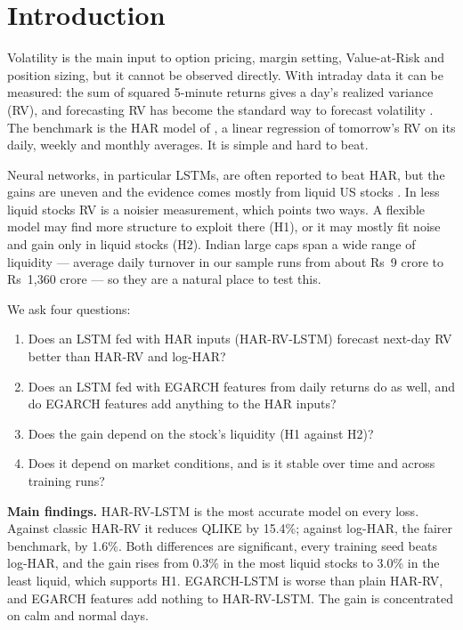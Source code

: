 \documentclass[11pt,a4paper]{article}
\let\oldsection\section
\renewcommand{\section}{\FloatBarrier\needspace{6\baselineskip}\oldsection}
\begin{document}
\tableofcontents
\clearpage

\section{Introduction}

Volatility is the main input to option pricing, margin setting, Value-at-Risk and position sizing,
but it cannot be observed directly. With intraday data it can be measured: the sum of squared 5-minute
returns gives a day's realized variance (RV), and forecasting RV has become the standard way to forecast
volatility \citep{andersen2003}. The benchmark is the HAR model of \citet{corsi2009}, a linear
regression of tomorrow's RV on its daily, weekly and monthly averages. It is simple and hard to beat.

Neural networks, in particular LSTMs, are often reported to beat HAR, but the gains are uneven and
the evidence comes mostly from liquid US stocks \citep{bucci2020,rahimikia2020,christensen2023}.
In less liquid stocks RV is a noisier measurement, which points two ways. A flexible model may find more
structure to exploit there (H1), or it may mostly fit noise and gain only in liquid stocks (H2).
Indian large caps span a wide range of liquidity --- average daily turnover in our sample runs from
about Rs~9 crore to Rs~1,360 crore --- so they are a natural place to test this.

We ask four questions:
\begin{enumerate}
\item Does an LSTM fed with HAR inputs (HAR-RV-LSTM) forecast next-day RV better than HAR-RV and log-HAR?
\item Does an LSTM fed with EGARCH features from daily returns do as well, and do EGARCH features add
anything to the HAR inputs?
\item Does the gain depend on the stock's liquidity (H1 against H2)?
\item Does it depend on market conditions, and is it stable over time and across training runs?
\end{enumerate}

\textbf{Main findings.} HAR-RV-LSTM is the most accurate model on every loss. Against classic HAR-RV it
reduces QLIKE by 15.4\%; against log-HAR, the fairer benchmark, by 1.6\%. Both differences are
significant, every training seed beats log-HAR, and the gain rises from 0.3\% in the most liquid stocks to
3.0\% in the least liquid, which supports H1. EGARCH-LSTM is worse than plain HAR-RV, and EGARCH features
add nothing to HAR-RV-LSTM. The gain is concentrated on calm and normal days.
\end{document}
